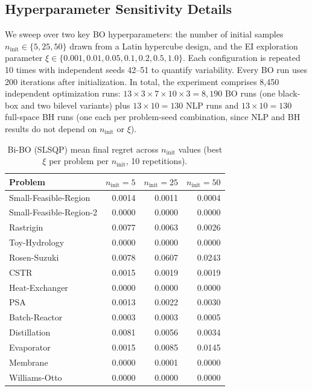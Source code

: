 \documentclass[12pt,a4paper]{article}%
\theoremstyle{plain}%
\theoremstyle{remark}%
\theoremstyle{definition}%
\begin{document}
\begin{appendices}
\section{Hyperparameter Sensitivity Details}\label{sec:hyperparameter_details}

We sweep over two key BO hyperparameters: the number of initial samples $n_\text{init} \in \{5, 25, 50\}$ drawn from a Latin hypercube design, and the EI exploration parameter $\xi \in \{0.001, 0.01, 0.05, 0.1, 0.2, 0.5, 1.0\}$. Each configuration is repeated 10 times with independent seeds 42--51 to quantify variability. Every BO run uses 200 iterations after initialization. In total, the experiment comprises 8{,}450 independent optimization runs: $13 \times 3 \times 7 \times 10 \times 3 = 8{,}190$ BO runs (one black-box and two bilevel variants) plus $13 \times 10 = 130$ NLP runs and $13 \times 10 = 130$ full-space BH runs (one each per problem-seed combination, since NLP and BH results do not depend on $n_\text{init}$ or $\xi$).

\begin{table}[htbp]
\centering
\caption{Bi-BO (SLSQP) mean final regret across $n_\text{init}$ values (best $\xi$ per problem per $n_\text{init}$, 10 repetitions).}
\label{tab:ninit_sensitivity}
\begin{tabular}{@{}lrrr@{}}
\toprule
\textbf{Problem} & $n_\text{init}=5$ & $n_\text{init}=25$ & $n_\text{init}=50$ \\
\midrule
Small-Feasible-Region   & 0.0014 & 0.0011 & 0.0004 \\
Small-Feasible-Region-2 & 0.0000 & 0.0000 & 0.0000 \\
Rastrigin               & 0.0077 & 0.0063 & 0.0026 \\
Toy-Hydrology           & 0.0000 & 0.0000 & 0.0000 \\
Rosen-Suzuki            & 0.0078 & 0.0607 & 0.0243 \\
\midrule
CSTR                    & 0.0015 & 0.0019 & 0.0019 \\
Heat-Exchanger          & 0.0000 & 0.0000 & 0.0000 \\
PSA                     & 0.0013 & 0.0022 & 0.0030 \\
Batch-Reactor           & 0.0003 & 0.0003 & 0.0005 \\
Distillation            & 0.0081 & 0.0056 & 0.0034 \\
Evaporator              & 0.0015 & 0.0085 & 0.0145 \\
Membrane                & 0.0000 & 0.0001 & 0.0000 \\
Williams-Otto           & 0.0000 & 0.0000 & 0.0000 \\
\bottomrule
\end{tabular}
\end{table}


\end{appendices}
\end{document}
